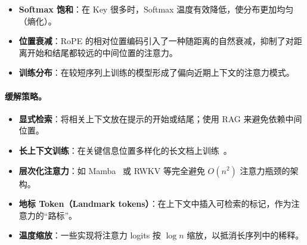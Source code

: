 \begin{itemize}
  \item \textbf{Softmax 饱和}：在 Key 很多时，Softmax 温度有效降低，使分布更加均匀（熵化）。
  \item \textbf{位置衰减}：RoPE 的相对位置编码引入了一种随距离的自然衰减，抑制了对距离开始和结尾都较远的中间位置的注意力。
  \item \textbf{训练分布}：在较短序列上训练的模型形成了偏向近期上下文的注意力模式。
\end{itemize}

\paragraph{缓解策略。}
\label{mitigation-strategies.}

\begin{itemize}
  \item \textbf{显式检索}：将相关上下文放在提示的开始或结尾；使用 RAG 来避免依赖中间位置。
  \item \textbf{长上下文训练}：在关键信息位置多样化的长文档上训练~\cite{fu2024data}。
  \item \textbf{层次化注意力}：如 Mamba~\cite{gu2023mamba} 或 RWKV 等完全避免 $O(n^2)$ 注意力瓶颈的架构。
  \item \textbf{地标 Token（Landmark tokens）}：在上下文中插入可检索的标记，作为注意力的``路标''。
  \item \textbf{温度缩放}：一些实现将注意力 logits 按 $\log n$ 缩放，以抵消长序列中的稀释。
\end{itemize}


